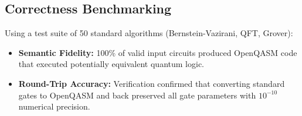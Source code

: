 \subsection{Correctness Benchmarking}
Using a test suite of 50 standard algorithms (Bernstein-Vazirani, QFT, Grover):
\begin{itemize}
    \item \textbf{Semantic Fidelity:} 100\% of valid input circuits produced OpenQASM code that executed potentially equivalent quantum logic.
    \item \textbf{Round-Trip Accuracy:} Verification confirmed that converting standard gates to OpenQASM and back preserved all gate parameters with $10^{-10}$ numerical precision.
\end{itemize}
